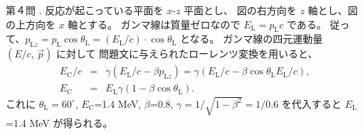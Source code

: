 \documentclass[fleqn]{jbook}
\begin{document}
\begin{answer}{第４問}{}
{%
  .
  反応が起こっている平面を $x$-$z$ 平面とし、
  図の右方向を $z$ 軸とし、図の上方向を $x$ 軸とする。
  ガンマ線は質量ゼロなので $E_\mathrm{L}=p_\mathrm{L}c$ である。
  従って、$p_{\mathrm{L}z} = p_{\mathrm{L}}\cos\theta_\mathrm{L} = (E_\mathrm{L}/c)\cdot\cos\theta_\mathrm{L} $ となる。
  ガンマ線の四元運動量 $(E/c,\, \vec p)$ に対して
  問題文に与えられたローレンツ変換を用いると、
  \begin{eqnarray}
    E_\mathrm{C}/c &=& \gamma (E_\mathrm{L}/c - \beta p_{\mathrm{L}z}) = \gamma (E_\mathrm{L}/c -\beta \cos\theta_\mathrm{L} E_\mathrm{L}/c),\\
    E_\mathrm{C} &=& E_\mathrm{L} \gamma(1 -\beta \cos\theta_\mathrm{L} ).
  \end{eqnarray}
  これに $\theta_\mathrm{L}=60^\circ$, $E_\mathrm{C}$=1.4 MeV, $\beta$=0.8, $\gamma =1/\sqrt{1-\beta ^2}=1/0.6$ を代入すると
  $E_\mathrm{L}$=1.4 MeV が得られる。
}\\

\end{answer}
\end{document}

